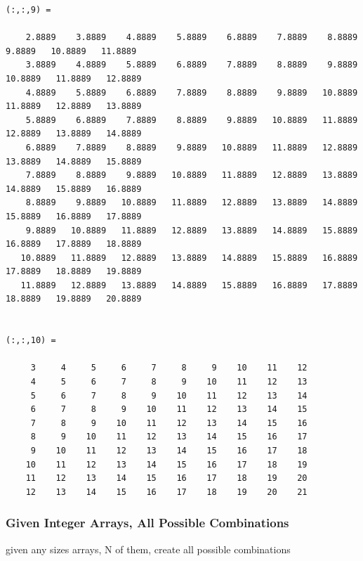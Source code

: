\documentclass[
]{book}
\begin{document}
\begin{verbatim}
(:,:,9) =

    2.8889    3.8889    4.8889    5.8889    6.8889    7.8889    8.8889    9.8889   10.8889   11.8889
    3.8889    4.8889    5.8889    6.8889    7.8889    8.8889    9.8889   10.8889   11.8889   12.8889
    4.8889    5.8889    6.8889    7.8889    8.8889    9.8889   10.8889   11.8889   12.8889   13.8889
    5.8889    6.8889    7.8889    8.8889    9.8889   10.8889   11.8889   12.8889   13.8889   14.8889
    6.8889    7.8889    8.8889    9.8889   10.8889   11.8889   12.8889   13.8889   14.8889   15.8889
    7.8889    8.8889    9.8889   10.8889   11.8889   12.8889   13.8889   14.8889   15.8889   16.8889
    8.8889    9.8889   10.8889   11.8889   12.8889   13.8889   14.8889   15.8889   16.8889   17.8889
    9.8889   10.8889   11.8889   12.8889   13.8889   14.8889   15.8889   16.8889   17.8889   18.8889
   10.8889   11.8889   12.8889   13.8889   14.8889   15.8889   16.8889   17.8889   18.8889   19.8889
   11.8889   12.8889   13.8889   14.8889   15.8889   16.8889   17.8889   18.8889   19.8889   20.8889


(:,:,10) =

     3     4     5     6     7     8     9    10    11    12
     4     5     6     7     8     9    10    11    12    13
     5     6     7     8     9    10    11    12    13    14
     6     7     8     9    10    11    12    13    14    15
     7     8     9    10    11    12    13    14    15    16
     8     9    10    11    12    13    14    15    16    17
     9    10    11    12    13    14    15    16    17    18
    10    11    12    13    14    15    16    17    18    19
    11    12    13    14    15    16    17    18    19    20
    12    13    14    15    16    17    18    19    20    21
\end{verbatim}

\hypertarget{given-integer-arrays-all-possible-combinations}{%
\subsubsection{Given Integer Arrays, All Possible Combinations}\label{given-integer-arrays-all-possible-combinations}}

given any sizes arrays, N of them, create all possible combinations
\end{document}
